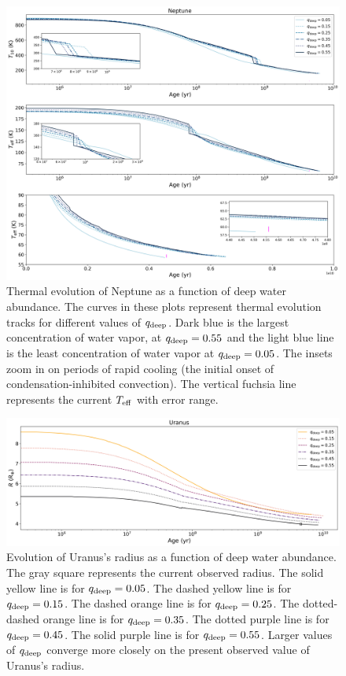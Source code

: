 \documentclass[11pt]{ucscthesisbs}
\begin{document}
\begin{figure}[ht]
 \centerline{
  \includegraphics[scale=0.45]{figures/n_cooling_curves_nz_4096_more_qdeeps.png}
 }
\caption[Thermal Evolution Curves for Neptune - Water Vapor Concentration Comparisons]
{Thermal evolution of Neptune as a function of deep water abundance. The curves in these plots represent thermal evolution tracks for different values of $q_{\rm deep}$. Dark blue is the largest concentration of water vapor, at $q_{\rm deep} = 0.55$ and the light blue line is the least concentration of water vapor at $q_{\rm deep} = 0.05$. The insets zoom in on periods of rapid cooling (the initial onset of condensation-inhibited convection). The vertical fuchsia line represents the current $T_{\rm eff}$ with error range.}
\label{fig:evolve_neptune_qdeeps}
\end{figure}



\begin{figure}[ht]
 \centerline{
  \includegraphics[scale=0.40]{figures/u_cooling_radius_nz_4096_logx_more_qdeeps.png}
 }
\caption[Thermal Evolution Curves for Uranus - Radius]
{Evolution of Uranus's radius as a function of deep water abundance. The gray square represents the current observed radius. The solid yellow line is for $q_{\rm deep} = 0.05$. The dashed yellow line is for $q_{\rm deep} = 0.15$. The dashed orange line is for $q_{\rm deep} = 0.25$. The dotted-dashed orange line is for $q_{\rm deep} = 0.35$. The dotted purple line is for $q_{\rm deep} = 0.45$. The solid purple line is for $q_{\rm deep} = 0.55$. Larger values of $q_{\rm deep}$ converge more closely on the present observed value of Uranus's radius. }
\label{fig:evolve_uranus_radius}
\end{figure}
\end{document}
